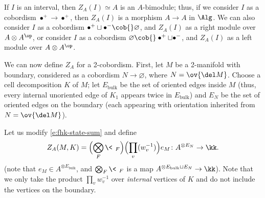If $I$ is an interval, then $Z_A(I)\simeq A$ is an $A$-bimodule; thus, if we
consider $I$ as a cobordism $\bullet^+\to \bullet^+$, then $Z_A(I)$ is a
morphism $A\to A$ in $\Alg$. We can also consider $I$ as a cobordism
$\bullet^+\sqcup\bullet^-\cob{}\varnothing$, and $Z_A(I)$ as a right module
over $A\otimes A^\op$, or consider $I$ as a cobordism
$\varnothing\cob{}\bullet^+\sqcup\bullet^-$, and $Z_A(I)$ as a left module over
$A\otimes A^\op$.


We can now define $Z_A$ for a 2-cobordism. First, let $M$ be a 2-manifold with
boundary, considered as a cobordism $N\to \varnothing$, where $N=\ov{\del M}$.
Choose a cell decomposition $K$ of $M$; let $E_{\mathrm{bulk}}$ be the set of
oriented edges inside $M$ (thus, every internal unoriented edge of $K_1$
appears twice in $E_{\mathrm{bulk}}$) and $E_{N}$ be the set of oriented edges
on the boundary (each appearing with orientation inherited from $N=\ov{\del
M}$).

Let us modify \eqref{e:fhk-state-sum} and define
\begin{equation}\label{e:fhk-state-sum2}
  Z_A(M,K)= \Bigl(\bigotimes_F \< \, \>_F\Bigr)
  \Bigl(\prod_v(w^{-1}_v) \Bigr)e_M\colon A^{\otimes E_N}\to \kk.
\end{equation}
(note that $e_M\in A^{\otimes E_{\mathrm{bulk}}}$, and $\bigotimes_F \< \, \>_F$ is
a map $A^{\otimes E_{\mathrm{bulk}}\sqcup E_N}\to \kk$). Note that we only take the
product $\prod_v w^{-1}_v$ over \emph{internal} vertices of $K$ and do
not include the vertices on the boundary.

